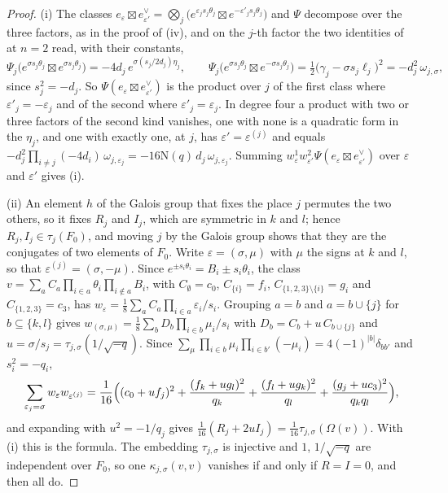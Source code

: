 \documentclass[11pt,reqno]{amsart}
\theoremstyle{plain}
\theoremstyle{definition}
\theoremstyle{remark}
\newcommand{\Nm}{\mathrm{N}}             %
\begin{document}
\begin{proof}
(i) The classes $e_{\varepsilon}\boxtimes e_{\varepsilon'}^{\vee}
=\bigotimes_{j}\bigl(e^{\varepsilon_{j}s_{j}\theta_{j}}\boxtimes
e^{-\varepsilon'_{j}s_{j}\theta_{j}}\bigr)$ and $\Psi$ decompose over the three
factors, as in the proof of (iv), and on the $j$-th
factor the two identities of  at $n=2$ read, with their
constants,
\[
  \Psi_{j}\bigl(e^{\sigma s_{j}\theta_{j}}\boxtimes e^{\sigma s_{j}\theta_{j}}\bigr)
  =-4d_{j}\,e^{\sigma(s_{j}/2d_{j})\eta_{j}},
  \qquad
  \Psi_{j}\bigl(e^{\sigma s_{j}\theta_{j}}\boxtimes e^{-\sigma s_{j}\theta_{j}}\bigr)
  =\tfrac12\bigl(\gamma_{j}-\sigma s_{j}\ell_{j}\bigr)^{2}
  =-d_{j}^{2}\,\omega_{j,\sigma},
\]
since $s_{j}^{2}=-d_{j}$. So
$\Psi(e_{\varepsilon}\boxtimes e_{\varepsilon'}^{\vee})$ is the product over
$j$ of the first class where $\varepsilon'_{j}=-\varepsilon_{j}$ and of the
second where $\varepsilon'_{j}=\varepsilon_{j}$. In degree four a product with
two or three factors of the second kind vanishes, one with none is a
quadratic form in the $\eta_{j}$, and one with exactly one, at $j$, has
$\varepsilon'=\varepsilon^{(j)}$ and equals
$-d_{j}^{2}\prod_{i\ne j}(-4d_{i})\,\omega_{j,\varepsilon_{j}}
=-16\Nm(q)\,d_{j}\,\omega_{j,\varepsilon_{j}}$. Summing
$w^{1}_{\varepsilon}w^{2}_{\varepsilon'}\Psi(e_{\varepsilon}\boxtimes
e_{\varepsilon'}^{\vee})$ over $\varepsilon$ and $\varepsilon'$ gives (i).

(ii) An element $h$ of the Galois group that fixes the place $j$ permutes
the two others, so it fixes $R_{j}$ and $I_{j}$, which are symmetric in $k$
and $l$; hence $R_{j},I_{j}\in\tau_{j}(F_{0})$, and moving $j$ by the Galois
group shows that they are the conjugates of two elements of $F_{0}$. Write
$\varepsilon=(\sigma,\mu)$ with $\mu$ the signs at $k$ and $l$, so that
$\varepsilon^{(j)}=(\sigma,-\mu)$. Since $e^{\pm s_{i}\theta_{i}}=B_{i}\pm
s_{i}\theta_{i}$, the class $v=\sum_{a}C_{a}\prod_{i\in a}\theta_{i}
\prod_{i\notin a}B_{i}$, with $C_{\emptyset}=c_{0}$, $C_{\{i\}}=f_{i}$,
$C_{\{1,2,3\}\setminus\{i\}}=g_{i}$ and $C_{\{1,2,3\}}=c_{3}$, has
$w_{\varepsilon}=\frac18\sum_{a}C_{a}\prod_{i\in a}\varepsilon_{i}/s_{i}$.
Grouping $a=b$ and $a=b\cup\{j\}$ for $b\subseteq\{k,l\}$ gives
$w_{(\sigma,\mu)}=\frac18\sum_{b}D_{b}\prod_{i\in b}\mu_{i}/s_{i}$ with
$D_{b}=C_{b}+u\,C_{b\cup\{j\}}$ and $u=\sigma/s_{j}=\tau_{j,\sigma}(1/\sqrt{-q})$.
Since $\sum_{\mu}\prod_{i\in b}\mu_{i}\prod_{i\in b'}(-\mu_{i})
=4(-1)^{|b|}\delta_{bb'}$ and $s_{i}^{2}=-q_{i}$,
\[
  \sum_{\varepsilon_{j}=\sigma}w_{\varepsilon}w_{\varepsilon^{(j)}}
  =\frac1{16}\Bigl((c_{0}+uf_{j})^{2}+\frac{(f_{k}+ug_{l})^{2}}{q_{k}}
  +\frac{(f_{l}+ug_{k})^{2}}{q_{l}}+\frac{(g_{j}+uc_{3})^{2}}{q_{k}q_{l}}\Bigr),
\]
and expanding with $u^{2}=-1/q_{j}$ gives $\frac1{16}(R_{j}+2uI_{j})
=\frac1{16}\tau_{j,\sigma}(\Omega(v))$. With (i) this is the formula. The
embedding $\tau_{j,\sigma}$ is injective and $1$, $1/\sqrt{-q}$ are
independent over $F_{0}$, so one $\kappa_{j,\sigma}(v,v)$ vanishes if and only
if $R=I=0$, and then all do.


\end{proof}
\end{document}
